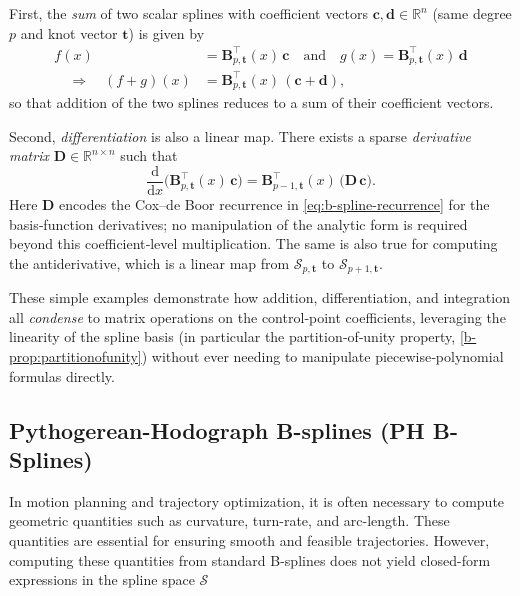 First, the \emph{sum} of two scalar splines with coefficient vectors $\mathbf{c},\mathbf{d}\in\mathbb R^n$ (same degree $p$ and knot vector $\mathbf{t}$) is given by
\begin{equation}
    \begin{aligned}
        f(x) &= \mathbf{B}_{p,\mathbf{t}}^\top(x)\,\mathbf{c}
        \quad\text{and}\quad
        g(x) = \mathbf{B}_{p,\mathbf{t}}^\top(x)\,\mathbf{d} \\
        \quad\Longrightarrow\quad
        (f+g)(x)
        &= \mathbf{B}_{p,\mathbf{t}}^\top(x)\,(\mathbf{c}+\mathbf{d})\!,
    \end{aligned}
\end{equation}
so that addition of the two splines reduces to a sum of their coefficient vectors.  

Second, \emph{differentiation} is also a linear map.  There exists a sparse \emph{derivative matrix} $\mathbf{D}\in\mathbb R^{n\times n}$ such that
\begin{equation}
  \frac{\mathrm{d}}{\mathrm{d}x}\bigl(\mathbf{B}_{p,\mathbf{t}}^\top(x)\,\mathbf{c}\bigr)
  = \mathbf{B}_{p-1,\mathbf{t}}^\top(x)\,\bigl(\mathbf{D}\,\mathbf{c}\bigr).
\end{equation}
Here $\mathbf{D}$ encodes the Cox–de Boor recurrence in \cref{eq:b-spline-recurrence} for the basis‐function derivatives; no manipulation of the analytic form is required beyond this coefficient‐level multiplication. The same is also true for computing the antiderivative, which is a linear map from $\mathcal{S}_{p,\mathbf{t}}$ to $\mathcal{S}_{p+1,\mathbf{t}}$.

These simple examples demonstrate how addition, differentiation, and integration all \emph{condense} to matrix operations on the control‐point coefficients, leveraging the linearity of the spline basis (in particular the partition‐of‐unity property, \cref{b-prop:partitionofunity}) without ever needing to manipulate piecewise‐polynomial formulas directly.


\subsection{Pythogerean-Hodograph B-splines (PH B-Splines)}\label{sec:pythogerean-hodograph}
In motion planning and trajectory optimization, it is often necessary to compute geometric quantities such as curvature, turn-rate, and arc-length. These quantities are essential for ensuring smooth and feasible trajectories. However, computing these quantities from standard B-splines does not yield closed-form expressions in the spline space $\mathcal S$ 


